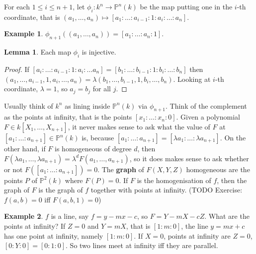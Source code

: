 \documentclass{article}
\renewcommand{\P}{\mathbb{P}}
\newcommand{\rb}[1]{\left( #1 \right)}
\renewcommand{\sb}[1]{\left[ #1 \right]}
\theoremstyle{definition}\newtheorem{definition}{Definition}[section]
\theoremstyle{definition}\newtheorem{remark}[definition]{Remark}
\theoremstyle{definition}\newtheorem*{example}{Example}
\theoremstyle{definition}\newtheorem*{note}{Note}
\newtheorem{lemma}[definition]{Lemma}
\begin{document}
For each $ 1 \le i \le n + 1 $, let $ \phi_i : k^n \to \P^n\rb{k} $ be the map putting one in the $ i $-th coordinate, that is $ \rb{a_1, \dots, a_n} \mapsto \sb{a_1 : \dots : a_{i - 1} : 1 : a_i : \dots : a_n} $.

\begin{example}
$ \phi_{n + 1}\rb{\rb{a_1, \dots, a_n}} = \sb{a_1 : \dots : a_n : 1} $.
\end{example}

\begin{lemma}
Each map $ \phi_i $ is injective.
\end{lemma}

\begin{proof}
If $ \sb{a_i : \dots : a_{i - 1} : 1 : a_i : \dots a_n} = \sb{b_1 : \dots : b_{i - 1} : 1 : b_i : \dots : b_n} $ then $ \rb{a_1, \dots, a_{i - 1}, 1, a_i, \dots, a_n} = \lambda\rb{b_1, \dots, b_{i - 1}, 1, b_i, \dots, b_n} $. Looking at $ i $-th coordinate, $ \lambda = 1 $, so $ a_j = b_j $ for all $ j $.
\end{proof}

Usually think of $ k^n $ as lining inside $ \P^n\rb{k} $ via $ \phi_{n + 1} $. Think of the complement as the points at infinity, that is the points $ \sb{x_1 : \dots : x_n : 0} $. Given a polynomial $ F \in k\sb{X_1, \dots, X_{n + 1}} $, it never makes sense to ask what the value of $ F $ at $ \sb{a_1 : \dots : a_{n + 1}} \in \P^n\rb{k} $ is, because $ \sb{a_1 : \dots : a_{n + 1}} = \sb{\lambda a_1 : \dots : \lambda a_{n + 1}} $. On the other hand, if $ F $ is homogeneous of degree $ d $, then $ F\rb{\lambda a_1, \dots, \lambda a_{n + 1}} = \lambda^d F\rb{a_1, \dots, a_{n + 1}} $, so it does makes sense to ask whether or not $ F\rb{\sb{a_1 : \dots : a_{n + 1}}} = 0 $. The \textbf{graph} of $ F\rb{X, Y, Z} $ homogeneous are the points $ P $ of $ \P^2\rb{k} $ where $ F\rb{P} = 0 $. If $ F $ is the homogenisation of $ f $, then the graph of $ F $ is the graph of $ f $ together with points at infinity. (TODO Exercise: $ f\rb{a, b} = 0 $ iff $ F\rb{a, b, 1} = 0 $)

\begin{example}
$ f $ is a line, say $ f = y - mx - c $, so $ F = Y - mX - cZ $. What are the points at infinity? If $ Z = 0 $ and $ Y = mX $, that is $ \sb{1 : m : 0} $, the line $ y = mx + c $ has one point at infinity, namely $ \sb{1 : m : 0} $. If $ X = 0 $, points at infinity are $ Z = 0 $, $ \sb{0 : Y : 0} = \sb{0 : 1 : 0} $. So two lines meet at infinity iff they are parallel.
\end{example}
\end{document}
